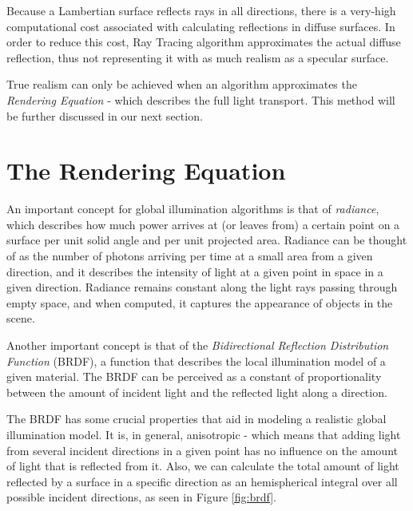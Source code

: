 
Because a Lambertian surface reflects rays in all directions, there is a very-high computational cost associated with calculating reflections in diffuse surfaces. In order to reduce this cost, Ray Tracing algorithm approximates the actual diffuse reflection, thus not representing it with as much realism as a specular surface.

True realism can only be achieved when an algorithm approximates the \textit{Rendering Equation} \cite{Kajiya:1986} - which describes the full light transport.
This method will be further discussed in our next section. 

\section{The Rendering Equation}

An important concept for global illumination algorithms is that of \textit{radiance}, which describes how much power arrives at (or leaves from) a certain point on a surface per unit solid angle and per unit projected area. Radiance can be thought of as the number of photons arriving per time at a small area from a given direction, and it describes the intensity of light at a given point in space in a given direction. Radiance remains constant along the light rays passing through empty space, and when computed, it captures the appearance of objects in the scene.

Another important concept is that of the \textit{Bidirectional Reflection Distribution Function} (BRDF), a function that describes the local illumination model of a given material. The BRDF can be perceived as a constant of proportionality between the amount of incident light and the reflected light along a direction. 

The BRDF has some crucial properties that aid in modeling a realistic global illumination model. It is, in general, anisotropic - which means that adding light from several incident directions in a given point has no influence on the amount of light that is reflected from it. Also, we can calculate the total amount of light reflected by a surface in a specific direction as an hemispherical integral over all possible incident directions, as seen in Figure \ref{fig:brdf}.

